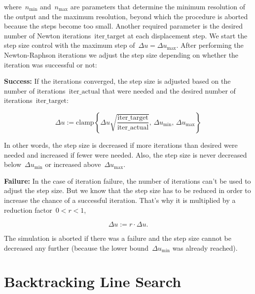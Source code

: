where~$n_\mathrm{min}$ and~$n_\mathrm{max}$ are parameters that determine the minimum resolution of the output and the maximum resolution, beyond which the procedure is aborted because the steps become too small.
Another required parameter is the desired number of Newton iterations~$\mathrm{iter\_target}$ at each displacement step.
We start the step size control with the maximum step of~$\Delta u = \Delta u_\mathrm{max}$.
After performing the Newton-Raphson iterations we adjust the step size depending on whether the iteration was successful or not:

\textbf{Success:} If the iterations converged, the step size is adjusted based on the number of iterations~$\mathrm{iter\_actual}$ that were needed and the desired number of iterations~$\mathrm{iter\_target}$:

\begin{equation}
\Delta u := \mathrm{clamp} \left\lbrace \Delta u \sqrt{\frac{\mathrm{iter\_target}}{\mathrm{iter\_actual}}},\,\Delta u_\mathrm{min},\,\Delta u_\mathrm{max} \right\rbrace
\end{equation}

In other words, the step size is decreased if more iterations than desired were needed and increased if fewer were needed.
Also, the step size is never decreased below~$\Delta u_\mathrm{min}$ or increased above~$\Delta u_\mathrm{max}$.

\textbf{Failure:} In the case of iteration failure, the number of iterations can't be used to adjust the step size.
But we know that the step size has to be reduced in order to increase the chance of a successful iteration.
That's why it is multiplied by a reduction factor~$0 < r < 1$,

\begin{equation}
\Delta u := r \cdot \Delta u.
\end{equation}

The simulation is aborted if there was a failure and the step size cannot be decreased any further (because the lower bound~$\Delta u_\mathrm{min}$ was already reached).

\newpage
\section{Backtracking Line Search}

